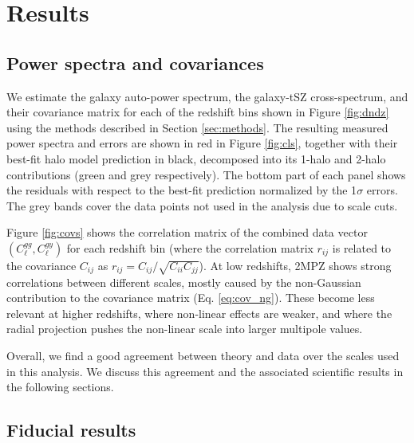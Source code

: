 \documentclass[useAMS,usenatbib]{mn2e}
\begin{document}
\section{Results}\label{sec:results}
  \subsection{Power spectra and covariances}\label{ssec:results.cls}
    We estimate the galaxy auto-power spectrum, the galaxy-tSZ cross-spectrum, and their covariance matrix for each of the redshift bins shown in Figure \ref{fig:dndz} using the methods described in Section \ref{sec:methods}. The resulting measured power spectra and errors are shown in red in Figure \ref{fig:cls}, together with their best-fit halo model prediction in black, decomposed into its 1-halo and 2-halo contributions (green and grey respectively). The bottom part of each panel shows the residuals with respect to the best-fit prediction normalized by the 1$\sigma$ errors. The grey bands cover the data points not used in the analysis due to scale cuts.
    
    Figure \ref{fig:covs} shows the correlation matrix of the combined data vector $(C^{gg}_\ell,C^{gy}_\ell)$ for each redshift bin (where the correlation matrix $r_{ij}$ is related to the covariance $C_{ij}$ as $r_{ij}=C_{ij}/\sqrt{C_{ii}C_{jj}}$). At low redshifts, 2MPZ shows strong correlations between different scales, mostly caused by the non-Gaussian contribution to the covariance matrix (Eq. \ref{eq:cov_ng}). These become less relevant at higher redshifts, where non-linear effects are weaker, and where the radial projection pushes the non-linear scale into larger multipole values.
    
    Overall, we find a good agreement between theory and data over the scales used in this analysis. We discuss this agreement and the associated scientific results in the following sections.

  \subsection{Fiducial results}\label{ssec:results.fid}  
    
\end{document}
